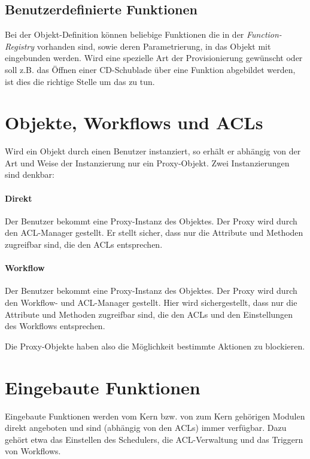 \subsection{Benutzerdefinierte Funktionen} 

Bei der Objekt-Definition können beliebige Funktionen die in der \textit{Function-Registry}
vorhanden sind, sowie deren Parametrierung, in das Objekt mit eingebunden werden. Wird
eine spezielle Art der Provisionierung gewünscht oder soll z.B. das Öffnen einer CD-Schublade
über eine Funktion abgebildet werden, ist dies die richtige Stelle um das zu tun.


\section{Objekte, Workflows und ACLs}

Wird ein Objekt durch einen Benutzer instanziert, so erhält er abhängig von der Art und
Weise der Instanzierung nur ein Proxy-Objekt. Zwei Instanzierungen sind denkbar:

\paragraph{Direkt}
Der Benutzer bekommt eine Proxy-Instanz des Objektes. Der Proxy wird durch den ACL-Manager
gestellt. Er stellt sicher, dass nur die Attribute und Methoden zugreifbar sind, die den
ACLs entsprechen.

\paragraph{Workflow}
Der Benutzer bekommt eine Proxy-Instanz des Objektes. Der Proxy wird durch den Workflow- und
ACL-Manager gestellt. Hier wird sichergestellt, dass nur die Attribute und Methoden zugreifbar
sind, die den ACLs und den Einstellungen des Workflows entsprechen.

Die Proxy-Objekte haben also die Möglichkeit bestimmte Aktionen zu blockieren.


\section{Eingebaute Funktionen}

Eingebaute Funktionen werden vom Kern bzw. von zum Kern gehörigen Modulen direkt angeboten
und sind (abhängig von den ACLs) immer verfügbar. Dazu gehört etwa das Einstellen des
Schedulers, die ACL-Verwaltung und das Triggern von Workflows.

